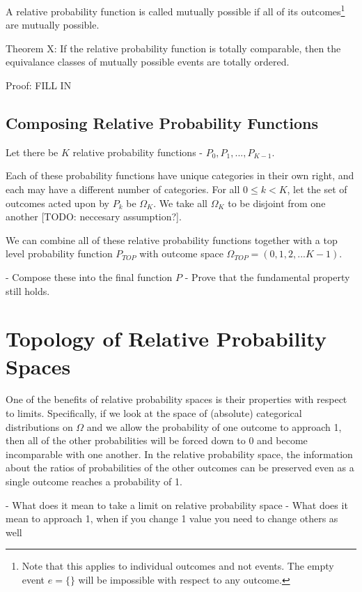 \documentclass[twoside]{article}
\begin{document}
A relative probability function is called mutually possible if all of its outcomes\footnote{Note that this applies to individual outcomes and not events. The empty event \(e = \{\}\) will be impossible with respect to any outcome.} are mutually possible.

Theorem X: If the relative probability function is totally comparable, then the equivalance classes of mutually possible events are totally ordered.

Proof: FILL IN

\subsection{Composing Relative Probability Functions}

Let there be \(K\) relative probability functions - \(P_0, P_1, ..., P_{K-1}\).

Each of these probability functions have unique categories in their own right, and each may have a different number of categories. For all \(0 \leq k < K\), let the set of outcomes acted upon by \(P_k\) be \(\Omega_K\). We take all \(\Omega_K\) to be disjoint from one another [TODO: neccesary assumption?].

We can combine all of these relative probability functions together with a top level probability function \(P_{TOP}\) with outcome space \(\Omega_{TOP} = (0, 1, 2, ... K- 1)\).

- Compose these into the final function \(P\)
- Prove that the fundamental property still holds.

\section{Topology of Relative Probability Spaces}

One of the benefits of relative probability spaces is their properties with respect to limits. Specifically, if we look at the space of (absolute) categorical distributions on \(\Omega\) and we allow the probability of one outcome to approach 1, then all of the other probabilities will be forced down to 0 and become incomparable with one another. In the relative probability space, the information about the ratios of probabilities of the other outcomes can be preserved even as a single outcome reaches a probability of 1.

- What does it mean to take a limit on relative probability space
- What does it mean to approach 1, when if you change 1 value you need to change others as well
\end{document}

